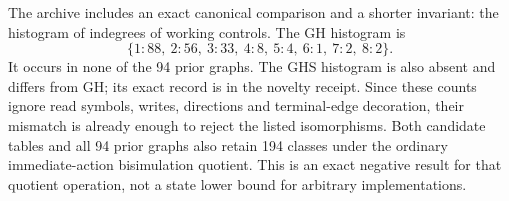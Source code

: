 The archive includes an exact canonical comparison and a shorter invariant:
the histogram of indegrees of working controls. The GH histogram is
\[
  \{1\!:\!88,\ 2\!:\!56,\ 3\!:\!33,\ 4\!:\!8,
        \ 5\!:\!4,\ 6\!:\!1,\ 7\!:\!2,\ 8\!:\!2\}.
\]
It occurs in none of the 94 prior graphs. The GHS histogram is also absent
and differs from GH; its exact record is in the novelty receipt. Since
these counts ignore read symbols, writes, directions and terminal-edge
decoration, their mismatch is already enough to reject the listed
isomorphisms. Both candidate tables and all 94 prior graphs also retain
194 classes under the ordinary immediate-action bisimulation quotient.
This is an exact negative result for that quotient operation, not a state
lower bound for arbitrary implementations.
